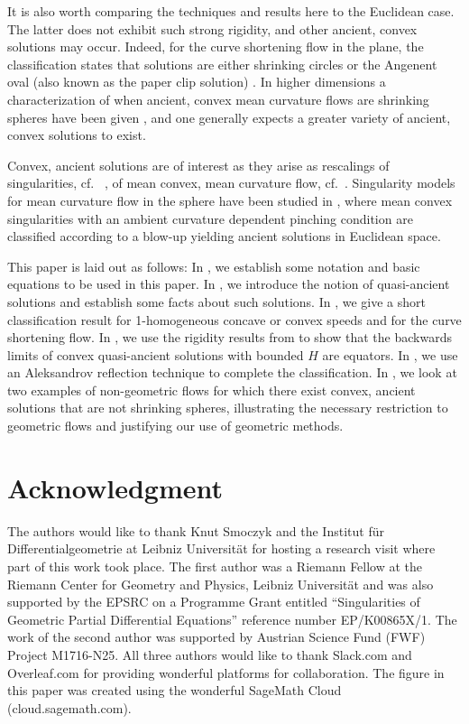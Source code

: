 \documentclass{amsart}
\begin{document}
It is also worth comparing the techniques and results here to the Euclidean case. The latter does not exhibit such strong rigidity, and other ancient, convex solutions may occur. Indeed, for the curve shortening flow in the plane, the classification \cite{DaskalopoulosHamiltonSesum:/2010} states that solutions are either shrinking circles or the Angenent oval (also known as the paper clip solution) \cite{Angenent:/1992}. In higher dimensions a characterization of when ancient, convex mean curvature flows are shrinking spheres have been given \cite{HuiskenSinestrari:10/2015,HaslhoferHershkovits:08/2013}, and one generally expects a greater variety of ancient, convex solutions to exist.

Convex, ancient solutions are of interest as they arise as rescalings of singularities, cf.~ \cite{HuiskenSinestrari:01/1999}, of mean convex, mean curvature flow, cf.~\cite{HuiskenSinestrari:09/1999, White:10/2002}. Singularity models for mean curvature flow in the sphere have been studied in \cite{Nguyen:07/2015}, where mean convex singularities with an ambient curvature dependent pinching condition are classified according to a blow-up yielding ancient solutions in Euclidean space.

This paper is laid out as follows: In , we establish some notation and basic equations to be used in this paper. In , we introduce the notion of quasi-ancient solutions and establish some facts about such solutions. In , we give a short classification result for 1-homogeneous concave or convex speeds and for the curve shortening flow. In , we use the rigidity results from \cite{MakowskiScheuer:/2013} to show that the backwards limits of convex quasi-ancient solutions with bounded \(H\) are equators. In , we use an Aleksandrov reflection technique to complete the classification. In , we look at two examples of non-geometric flows for which there exist convex, ancient solutions that are not shrinking spheres, illustrating the necessary restriction to geometric flows and justifying our use of geometric methods. 

\section*{Acknowledgment}
The authors would like to thank Knut Smoczyk and the Institut f\"{u}r Differentialgeometrie at Leibniz Universit\"at for hosting a research visit where part of this work took place. The first author was a Riemann Fellow at the Riemann Center for Geometry and Physics, Leibniz Universit\"{a}t and was also supported by the EPSRC on a Programme Grant entitled ``Singularities of Geometric Partial Differential Equations'' reference number EP/K00865X/1. The work of the second author was supported by Austrian Science Fund (FWF) Project M1716-N25. All three authors would like to thank Slack.com and Overleaf.com for providing wonderful platforms for collaboration. The figure in this paper was created using the wonderful SageMath Cloud (cloud.sagemath.com).
\end{document}
